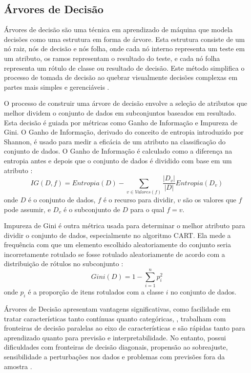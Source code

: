 \subsection{Árvores de Decisão}

Árvores de decisão são uma técnica em aprendizado de máquina que modela decisões como uma estrutura em forma de árvore. Esta estrutura consiste de um nó raiz, nós de decisão e nós folha, onde cada nó interno representa um teste em um atributo, os ramos representam o resultado do teste, e cada nó folha representa um rótulo de classe ou resultado de decisão. Este método simplifica o processo de tomada de decisão ao quebrar visualmente decisões complexas em partes mais simples e gerenciáveis \cite{quinlan1986induction, breiman1984classification}.

O processo de construir uma árvore de decisão envolve a seleção de atributos que melhor dividem o conjunto de dados em subconjuntos baseados em resultado. Esta decisão é guiada por métricas como Ganho de Informação e Impureza de Gini. O Ganho de Informação, derivado do conceito de entropia introduzido por Shannon, é usado para medir a eficácia de um atributo na classificação do conjunto de dados. O Ganho de Informação é calculado como a diferença na entropia antes e depois que o conjunto de dados é dividido com base em um atributo \cite{shannon1948mathematical, quinlan1986induction}:
\begin{equation}
    IG(D, f) = Entropia(D) - \sum_{v \in Valores(f)} \frac{|D_v|}{|D|} Entropia(D_v)
\end{equation}
onde \(D\) é o conjunto de dados, \(f\) é o recurso para dividir, \(v\) são os valores que \(f\) pode assumir, e \(D_v\) é o subconjunto de \(D\) para o qual \(f = v\).

Impureza de Gini é outra métrica usada para determinar o melhor atributo para dividir o conjunto de dados, especialmente no algoritmo CART. Ela mede a frequência com que um elemento escolhido aleatoriamente do conjunto seria incorretamente rotulado se fosse rotulado aleatoriamente de acordo com a distribuição de rótulos no subconjunto \cite{breiman1984classification}:
\begin{equation}
    Gini(D) = 1 - \sum_{i=1}^{n} p_i^2
\end{equation}
onde \(p_i\) é a proporção de itens rotulados com a classe \(i\) no conjunto de dados.

Árvores de Decisão apresentam vantagens significativas, como facilidade em tratar características tanto contínuas quanto categóricas, \cite{bhavani2021review}, trabalham com fronteiras de decisão paralelas ao eixo de características e são rápidas tanto para aprendizado quanto para previsão e interpretabilidade. No entanto, possui dificuldades com fronteiras de decisão diagonais, propensão ao sobreajuste, sensibilidade a perturbações nos dados e problemas com previsões fora da amostra \cite{kowsari2019text}.

